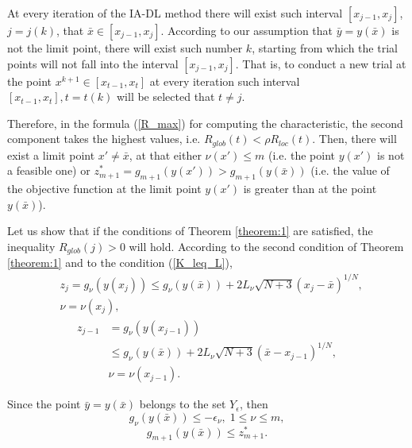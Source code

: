 \documentclass[twocolumn]{svjour3}          %
\begin{document}
	At every iteration of the IA-DL method there will exist such interval $[x_{j-1}, x_j]$, $j=j(k)$, that $\bar x \in [x_{j-1}, x_j]$. According to our assumption that $\bar y = y(\bar x)$ is not the limit point, there will exist such number $k$, starting from which the trial points will not fall into the interval $[x_{j-1}, x_j]$. That is, to conduct a new trial at the point $x^{k+1} \in [x_{t-1}, x_t]$ at every iteration such interval $[x_{t-1}, x_t], t=t(k)$ will be selected that $t \neq j$.

	Therefore, in the formula (\ref{R_max}) for computing the characteristic, the second component takes the highest values, i.e. $ R_{glob}(t) < \rho R_{loc}(t)$.
Then, there will exist a limit point $x' \neq \bar x$, at that either $\nu(x') \leq m$ (i.e. the point $y(x')$ is not a feasible one) or $z_{m+1}^\ast =g_{m+1}(y(x'))>g_{m+1}(y(\bar x))$ (i.e. the value of the objective function at the limit point $y(x')$ is greater than at the point $y(\bar x)$).

	Let us show that if the conditions of Theorem \ref{theorem:1} are satisfied, the inequality $R_{glob}(j)>0$ will hold. According to the second condition of Theorem \ref{theorem:1} and to the condition (\ref{K_leq_L}), 
\begin{align}
	& z_j = g_{\nu}\left( y(x_j) \right) \leq g_{\nu}\left( y(\bar x) \right) + 2L_{\nu}\sqrt{N+3}(x_j-\bar x)^{1/N}, \nonumber \\
	& \nu = \nu(x_j),
\end{align}
\begin{align}
	z_{j-1} & = g_{\nu}\left( y(x_{j-1}) \right) \nonumber \\
	& \leq g_{\nu}\left( y(\bar x) \right) + 2L_{\nu}\sqrt{N+3}(\bar x - x_{j-1})^{1/N}, \nonumber \\
	& \nu = \nu(x_{j-1}).
\end{align}

	Since the point $\bar y = y(\bar x)$ belongs to the set $Y_{\epsilon}$, then
\begin{equation*}
	g_{\nu}\left( y(\bar x) \right) \leq -\epsilon_{\nu}, \; 1\leq\nu\leq m,
\end{equation*}
\begin{equation*}
	g_{m+1}\left( y(\bar x) \right) \leq z_{m+1}^\ast.
\end{equation*}
\end{document}
